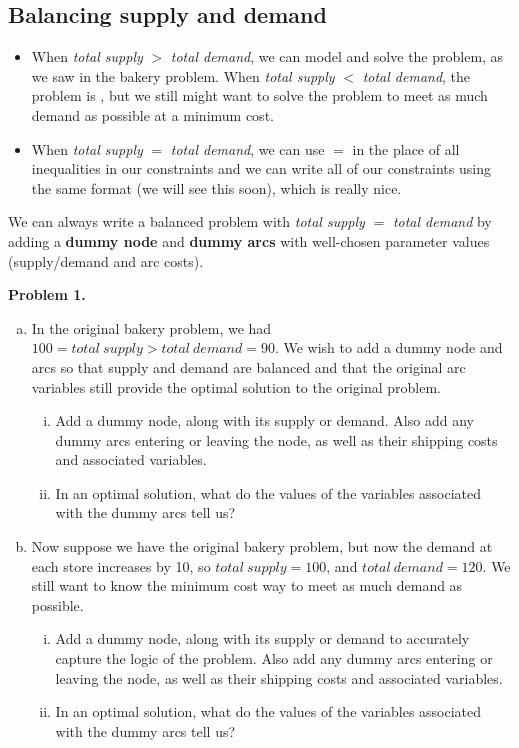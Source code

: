 \documentclass[11pt]{article}
\theoremstyle{definition}
\newtheorem{problem}{Problem}
\newcommand{\answerbox}[3]{%
  \fbox{%
    \begin{minipage}[#1]{#2}
      \hfill\vspace{#3}
    \end{minipage}
  }
}
\newcommand{\wordbox}{\answerbox{c}{1.2in}{.7cm}}
\begin{document}
\vfill
\subsection{Balancing supply and demand}
\begin{itemize}
\item When \emph{total supply} $>$ \emph{total demand}, we can model and solve the problem, as we saw in the bakery problem. When \emph{total supply} $<$ \emph{total demand}, the problem is \wordbox, but we still might want to solve the problem to meet as much demand as possible at a minimum cost.
\item When \emph{total supply} $=$ \emph{total demand}, we can use $=$ in the place of all inequalities in our constraints and we can write all of our constraints using the same format (we will see this soon), which is really nice.
\end{itemize}
\begin{tcolorbox}  We can always write a balanced problem with \emph{total supply} $=$ \emph{total demand} by adding a \textbf{dummy node} and \textbf{dummy arcs} with well-chosen parameter values (supply/demand and arc costs). 
\end{tcolorbox}

\newpage
\textbf{Problem 1.}
\smallskip
\begin{enumerate}[(a)]
\item  In the original bakery problem, we had $100 = total~supply > total~demand = 90$.    We wish to add a dummy node and arcs so that supply and demand are balanced and that the original arc variables still provide the optimal solution to the original problem.
\begin{enumerate}[(i)]
\item Add a dummy node, along with its supply or demand.   Also add any dummy arcs entering or leaving the node, as well as their shipping costs and associated variables. 
\item In an optimal solution, what do the values of the variables associated with the dummy arcs tell us? 
\end{enumerate}  
\vfill

\item  Now suppose we have the original bakery problem, but now the demand at each store increases by 10, so $total~supply = 100$, and $total~demand = 120$.  We still want to know the minimum cost way to meet as much demand as possible.
\begin{enumerate}[(i)]
\item Add a dummy node, along with its supply or demand to accurately capture the logic of the problem.  Also add any dummy arcs entering or leaving the node, as well as their shipping costs and associated variables.
\item In an optimal solution, what do the values of the variables associated with the dummy arcs tell us?
\end{enumerate}  
\end{enumerate}
\vfill
\end{document}
